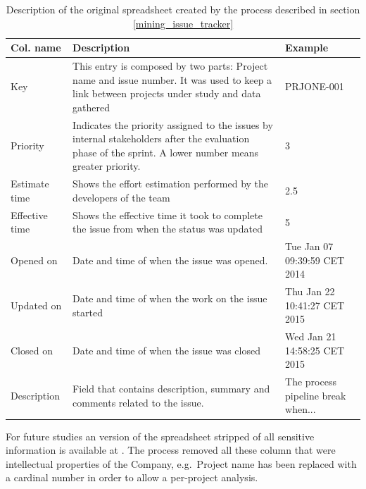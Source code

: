 \begin{table}[htb]
			\centering
			\renewcommand{\arraystretch}{1.2}
			\tabulinesep=1.2mm
            \caption[Original spreadsheet description]{Description of the original spreadsheet created by the process described in section \ref{mining_issue_tracker}}
            \label{tab:spreadsheet_description}
            
			\begin{tabu} to \textwidth {|X|X[4]|X|}
			    
				\hline
				\textbf{Col. name} & \textbf{Description} & \textbf{Example} \\ \hline
				
				Key & This entry is composed by two parts: Project name and issue number. It was used to keep a link between projects under study and data gathered & PRJONE-001 \\ \hline
				
				Priority & Indicates the priority assigned to the issues by internal stakeholders after the evaluation phase of the sprint. A lower number means greater priority. & 3 \\ \hline
				
				Estimate time & Shows the effort estimation performed by the developers of the team & 2.5 \\ \hline
				
				Effective time & Shows the effective time it took to complete the issue from when the status was updated & 5 \\ \hline
				
				Opened on & Date and time of when the issue was opened. & Tue Jan 07 09:39:59 CET 2014 \\ \hline
				
				Updated on & Date and time of when the work on the issue started & Thu Jan 22 10:41:27 CET 2015  \\ \hline
				
				Closed on & Date and time of when the issue was closed & Wed Jan 21 14:58:25 CET 2015 \\ \hline
				
				Description & Field that contains description, summary and comments related to the issue. & The process pipeline break when... \\ \hline
				
			\end{tabu}		
		\end{table}


For future studies an version of the spreadsheet stripped of all sensitive information is available at . The process removed all these column that were intellectual properties of the Company, e.g.\ Project name has been replaced with a cardinal number in order to allow a per-project analysis.


